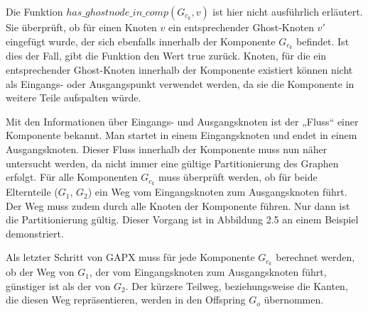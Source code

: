 \begin{bem}
  Die Funktion $has\_ghostnode\_in\_comp(G_{c_k}, v)$ ist hier nicht
  ausführlich erläutert. Sie überprüft, ob für einen Knoten $v$ ein
  entsprechender Ghost-Knoten $v'$ eingefügt wurde, der sich ebenfalls
  innerhalb der Komponente $G_{c_k}$ befindet. Ist dies der Fall, gibt
  die Funktion den Wert true zurück. Knoten, für die ein entsprechender
  Ghost-Knoten innerhalb der Komponente existiert können nicht als
  Eingangs- oder Ausgangspunkt verwendet werden, da sie die Komponente
  in weitere Teile aufspalten würde.
\end{bem}
Mit den Informationen über Eingangs- und Ausgangsknoten ist der „Fluss“ 
einer Komponente bekannt. Man startet in einem Eingangsknoten und endet
in einem Ausgangsknoten. Dieser Fluss innerhalb der Komponente muss nun
näher untersucht werden, da nicht immer eine gültige Partitionierung des
Graphen erfolgt.
Für alle Komponenten $G_{c_k}$ muss überprüft werden,
ob für beide Elternteile ($G_1$, $G_2$) ein Weg vom Eingangsknoten zum
Ausgangsknoten führt. Der Weg muss zudem durch alle Knoten der
Komponente führen. Nur dann ist die Partitionierung gültig. 
Dieser Vorgang ist in Abbildung 2.5 an einem Beispiel demonstriert.

Als letzter Schritt von GAPX muss für jede Komponente $G_{c_k}$ berechnet werden,
ob der Weg von $G_1$, der vom Eingangsknoten zum Ausgangsknoten führt,
günstiger ist als der von $G_2$. Der kürzere Teilweg, beziehungsweise die
Kanten, die diesen Weg repräsentieren, werden in den Offspring $G_o$
übernommen. 

